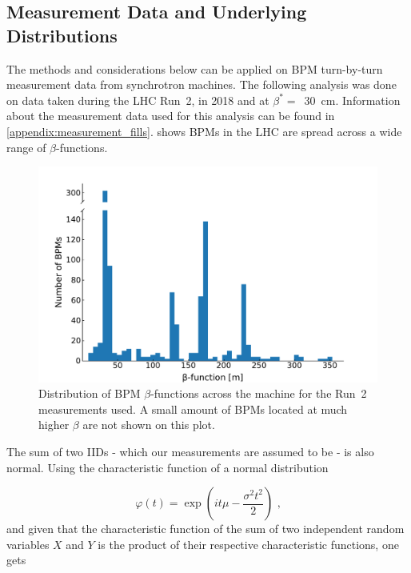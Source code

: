\subsection*{Measurement Data and Underlying Distributions}

The methods and considerations below can be applied on BPM turn-by-turn measurement data from synchrotron machines.
The following analysis was done on data taken during the LHC Run~\num{2}, in \num{2018} and at \(\beta^{\ast} =\)~\qty{30}{\centi\meter}.
Information about the measurement data used for this analysis can be found in \cref{appendix:measurement_fills}.
 shows BPMs in the LHC are spread across a wide range of \(\beta\)-functions.

\begin{figure}[!htb]
    \centering
    \includegraphics*[width=\textwidth]{Figures/Other_Studies/bpms_betas_histogram.pdf}
    \caption{Distribution of BPM \(\beta\)-functions across the machine for the Run~\num{2} measurements used. A small amount of BPMs located at much higher \(\beta\) are not shown on this plot.}
    \label{figure:bpms_betas_histogram}
\end{figure}

The sum of two IIDs - which our measurements are assumed to be - is also normal.
Using the characteristic function of a normal distribution

\begin{equation}
    \varphi(t) = \exp \left( it \mu - \frac{\sigma^2 t^2}{2} \right) \text{ ,}
    \label{equations:normal_distribution_characteristic_function}
\end{equation}
and given that the characteristic function of the sum of two independent random variables \(X\) and \(Y\) is the product of their respective characteristic functions, one gets

